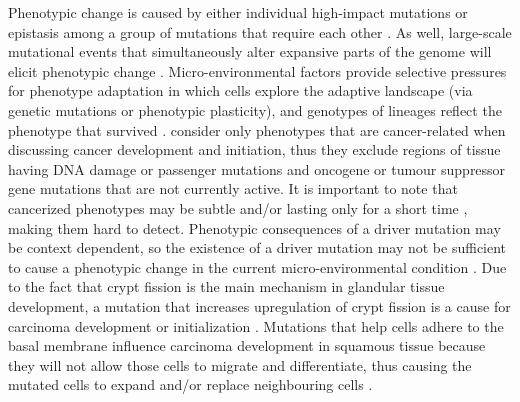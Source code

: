 \documentclass[\main/thesis.tex]{subfiles}
\begin{document}
Phenotypic change is caused by either individual high-impact mutations or epistasis among a group of mutations that require each other \parencite{Curtius}. As well, large-scale mutational events that simultaneously alter expansive parts of the genome will elicit phenotypic change \parencite{Li,Stachler}. Micro-environmental factors provide selective pressures for phenotype adaptation in which cells explore the adaptive landscape (via genetic mutations or phenotypic plasticity), and genotypes of lineages reflect the phenotype that survived \parencite{Curtius}. \textcite{Curtius} consider only phenotypes that are cancer-related when discussing cancer development and initiation, thus they exclude regions of tissue having DNA damage or passenger mutations and oncogene or tumour suppressor gene mutations that are not currently active. It is important to note that cancerized phenotypes may be subtle and/or lasting only for a short time \parencite{Curtius}, making them hard to detect. Phenotypic consequences of a driver mutation may be context dependent, so the existence of a driver mutation may not be sufficient to cause a phenotypic change in the current micro-environmental condition \parencite{Curtius}. Due to the fact that crypt fission is the main mechanism in glandular tissue development, a mutation that increases upregulation of crypt fission is a cause for carcinoma development or initialization \parencite{Curtius}. Mutations that help cells adhere to the basal membrane influence carcinoma development in squamous tissue because they will not allow those cells to migrate and differentiate, thus causing the mutated cells to expand and/or replace neighbouring cells \parencite{Curtius}.
\end{document}
